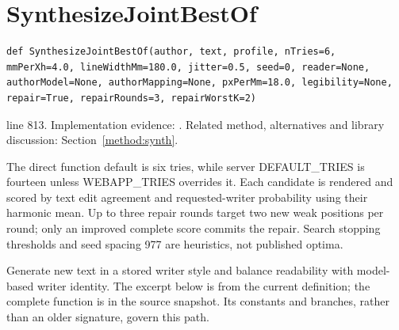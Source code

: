 \section{SynthesizeJointBestOf}\label{fn:synthesise:SynthesizeJointBestOf}
\begin{lstlisting}[style=sig]
def SynthesizeJointBestOf(author, text, profile, nTries=6, mmPerXh=4.0, lineWidthMm=180.0, jitter=0.5, seed=0, reader=None, authorModel=None, authorMapping=None, pxPerMm=18.0, legibility=None, repair=True, repairRounds=3, repairWorstK=2)
\end{lstlisting}
 line 813. Implementation evidence: \cite{code2026}. Related method, alternatives and library discussion: Section~\ref{method:synth}.


The direct function default is six tries, while server DEFAULT\_TRIES is fourteen unless WEBAPP\_TRIES overrides it. Each candidate is rendered and scored by text edit agreement and requested-writer probability using their harmonic mean. Up to three repair rounds target two new weak positions per round; only an improved complete score commits the repair. Search stopping thresholds and seed spacing 977 are heuristics, not published optima.


Generate new text in a stored writer style and balance readability with model-based writer identity. The excerpt below is from the current definition; the complete function is in the source snapshot. Its constants and branches, rather than an older signature, govern this path.


